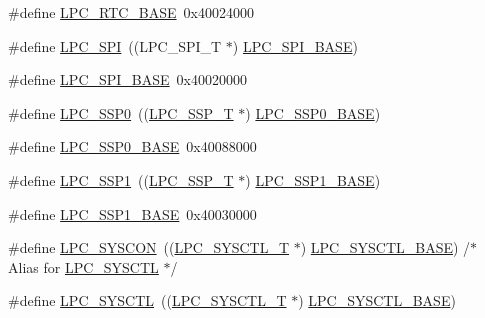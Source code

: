 \begin{DoxyCompactItemize}
\item 
\#define \hyperlink{group__PERIPH__175X__6X__BASE_ga4618213cf968f8245814d7d3e7aa2e2e}{L\+P\+C\+\_\+\+R\+T\+C\+\_\+\+B\+A\+SE}~0x40024000
\item 
\#define \hyperlink{group__PERIPH__175X__6X__BASE_ga9b593f008d0061052e90a8865d702ce5}{L\+P\+C\+\_\+\+S\+PI}~((L\+P\+C\+\_\+\+S\+P\+I\+\_\+T              $\ast$) \hyperlink{group__PERIPH__175X__6X__BASE_gaf611188188574ba805b6de71acc88c6c}{L\+P\+C\+\_\+\+S\+P\+I\+\_\+\+B\+A\+SE})
\item 
\#define \hyperlink{group__PERIPH__175X__6X__BASE_gaf611188188574ba805b6de71acc88c6c}{L\+P\+C\+\_\+\+S\+P\+I\+\_\+\+B\+A\+SE}~0x40020000
\item 
\#define \hyperlink{group__PERIPH__175X__6X__BASE_gac213e0325a8e8a972bd2e0dd6ccf353c}{L\+P\+C\+\_\+\+S\+S\+P0}~((\hyperlink{structLPC__SSP__T}{L\+P\+C\+\_\+\+S\+S\+P\+\_\+T}              $\ast$) \hyperlink{group__PERIPH__407X__8X__BASE_ga53fb1af80b541545988f2a966681abfd}{L\+P\+C\+\_\+\+S\+S\+P0\+\_\+\+B\+A\+SE})
\item 
\#define \hyperlink{group__PERIPH__175X__6X__BASE_ga53fb1af80b541545988f2a966681abfd}{L\+P\+C\+\_\+\+S\+S\+P0\+\_\+\+B\+A\+SE}~0x40088000
\item 
\#define \hyperlink{group__PERIPH__175X__6X__BASE_ga09c4610ada1d9aa18913963cbd1a6e52}{L\+P\+C\+\_\+\+S\+S\+P1}~((\hyperlink{structLPC__SSP__T}{L\+P\+C\+\_\+\+S\+S\+P\+\_\+T}              $\ast$) \hyperlink{group__PERIPH__407X__8X__BASE_ga05d118997f53f596d3a087f8b91a1969}{L\+P\+C\+\_\+\+S\+S\+P1\+\_\+\+B\+A\+SE})
\item 
\#define \hyperlink{group__PERIPH__175X__6X__BASE_ga05d118997f53f596d3a087f8b91a1969}{L\+P\+C\+\_\+\+S\+S\+P1\+\_\+\+B\+A\+SE}~0x40030000
\item 
\#define \hyperlink{group__PERIPH__175X__6X__BASE_gabe45c10a979fe812e3d9ecd72fe33a2f}{L\+P\+C\+\_\+\+S\+Y\+S\+C\+ON}~((\hyperlink{structLPC__SYSCTL__T}{L\+P\+C\+\_\+\+S\+Y\+S\+C\+T\+L\+\_\+T}           $\ast$) \hyperlink{group__PERIPH__407X__8X__BASE_gae4670b50fe27772fa31de1da10bec7b7}{L\+P\+C\+\_\+\+S\+Y\+S\+C\+T\+L\+\_\+\+B\+A\+SE}) /$\ast$ Alias for \hyperlink{group__PERIPH__407X__8X__BASE_ga30cc92eba86b30295b3dcf3da503b736}{L\+P\+C\+\_\+\+S\+Y\+S\+C\+TL} $\ast$/
\item 
\#define \hyperlink{group__PERIPH__175X__6X__BASE_ga30cc92eba86b30295b3dcf3da503b736}{L\+P\+C\+\_\+\+S\+Y\+S\+C\+TL}~((\hyperlink{structLPC__SYSCTL__T}{L\+P\+C\+\_\+\+S\+Y\+S\+C\+T\+L\+\_\+T}           $\ast$) \hyperlink{group__PERIPH__407X__8X__BASE_gae4670b50fe27772fa31de1da10bec7b7}{L\+P\+C\+\_\+\+S\+Y\+S\+C\+T\+L\+\_\+\+B\+A\+SE})

\end{DoxyCompactItemize}

